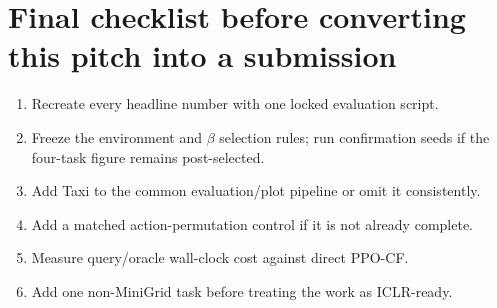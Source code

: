 \documentclass[11pt]{article}
\newcommand{\ppocf}{\textsc{PPO-CF}}
\begin{document}
\section*{Final checklist before converting this pitch into a submission}
\begin{enumerate}[leftmargin=1.6em]
  \item Recreate every headline number with one locked evaluation script.
  \item Freeze the environment and $\beta$ selection rules; run confirmation
  seeds if the four-task figure remains post-selected.
  \item Add Taxi to the common evaluation/plot pipeline or omit it consistently.
  \item Add a matched action-permutation control if it is not already complete.
  \item Measure query/oracle wall-clock cost against direct \ppocf{}.
  \item Add one non-MiniGrid task before treating the work as ICLR-ready.
\end{enumerate}
\end{document}
